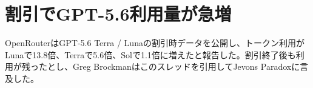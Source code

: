 \section{割引でGPT-5.6利用量が急増}
OpenRouterはGPT-5.6 Terra / Lunaの割引時データを公開し、トークン利用がLunaで13.8倍、Terraで5.6倍、Solで1.1倍に増えたと報告した。割引終了後も利用が残ったとし、Greg Brockmanはこのスレッドを引用してJevons Paradoxに言及した。
